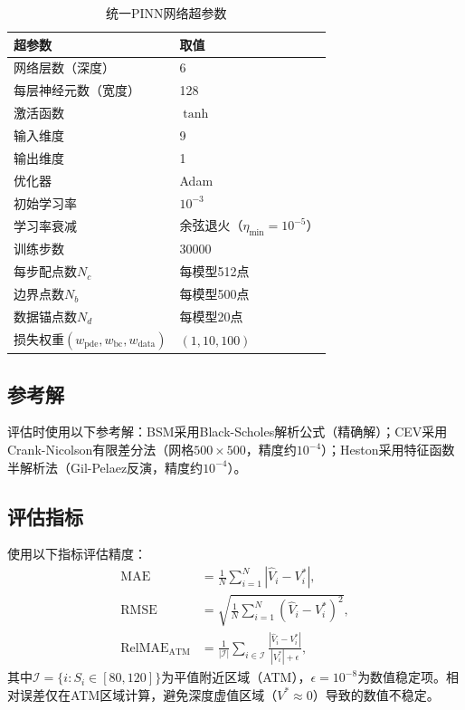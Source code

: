 \begin{table}[htbp]
  \centering
  \caption{统一PINN网络超参数}
  \label{tab:hyperparams}
  \begin{tabular}{ll}
    \hline
    超参数 & 取值 \\
    \hline
    网络层数（深度） & 6 \\
    每层神经元数（宽度） & 128 \\
    激活函数 & $\tanh$ \\
    输入维度 & 9 \\
    输出维度 & 1 \\
    优化器 & Adam \cite{kingma2014adam} \\
    初始学习率 & $10^{-3}$ \\
    学习率衰减 & 余弦退火（$\eta_\text{min}=10^{-5}$） \\
    训练步数 & 30000 \\
    每步配点数$N_c$ & 每模型512点 \\
    边界点数$N_b$ & 每模型500点 \\
    数据锚点数$N_d$ & 每模型20点 \\
    损失权重$(w_\text{pde}, w_\text{bc}, w_\text{data})$ & $(1, 10, 100)$ \\
    \hline
  \end{tabular}
\end{table}

\subsection{参考解}

评估时使用以下参考解：BSM采用Black-Scholes解析公式（精确解）；CEV采用Crank-Nicolson有限差分法（网格$500\times 500$，精度约$10^{-4}$）；Heston采用特征函数半解析法（Gil-Pelaez反演，精度约$10^{-4}$）。

\subsection{评估指标}

使用以下指标评估精度：
\begin{align}
  \text{MAE} &= \frac{1}{N}\sum_{i=1}^N |\hat{V}_i - V_i^*|, \\
  \text{RMSE} &= \sqrt{\frac{1}{N}\sum_{i=1}^N (\hat{V}_i - V_i^*)^2}, \\
  \text{RelMAE}_\text{ATM} &= \frac{1}{|\mathcal{I}|}\sum_{i\in\mathcal{I}} \frac{|\hat{V}_i - V_i^*|}{|V_i^*|+\epsilon},
\end{align}
其中$\mathcal{I}=\{i: S_i\in[80,120]\}$为平值附近区域（ATM），$\epsilon=10^{-8}$为数值稳定项。相对误差仅在ATM区域计算，避免深度虚值区域（$V^*\approx 0$）导致的数值不稳定。

